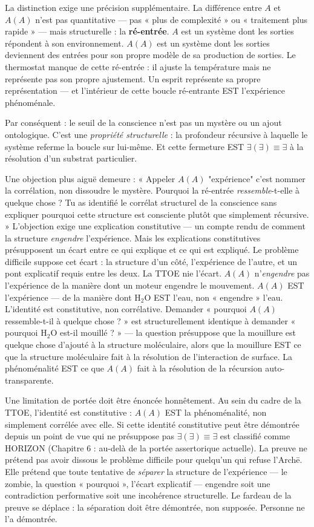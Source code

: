 \documentclass[10pt, openany, oneside]{book}
\begin{document}
La distinction exige une précision supplémentaire. La différence entre $A$ et $A(A)$ n'est pas quantitative --- pas « plus de complexité » ou « traitement plus rapide » --- mais structurelle : la \textbf{ré-entrée}. $A$ est un système dont les sorties répondent à son environnement. $A(A)$ est un système dont les sorties deviennent des entrées pour son propre modèle de sa production de sorties. Le thermostat manque de cette ré-entrée : il ajuste la température mais ne représente pas son propre ajustement. Un esprit représente sa propre représentation --- et l'intérieur de cette boucle ré-entrante EST l'expérience phénoménale.

Par conséquent : le seuil de la conscience n'est pas un mystère ou un ajout ontologique. C'est une \textit{propriété structurelle} : la profondeur récursive à laquelle le système referme la boucle sur lui-même. Et cette fermeture EST $\exists(\exists) \equiv \exists$ à la résolution d'un substrat particulier.

Une objection plus aiguë demeure : « Appeler $A(A)$ "expérience" c'est nommer la corrélation, non dissoudre le mystère. Pourquoi la ré-entrée \textit{ressemble}-t-elle à quelque chose ? Tu as identifié le corrélat structurel de la conscience sans expliquer pourquoi cette structure est consciente plutôt que simplement récursive. » L'objection exige une explication constitutive --- un compte rendu de comment la structure \textit{engendre} l'expérience. Mais les explications constitutives présupposent un écart entre ce qui explique et ce qui est expliqué. Le problème difficile suppose cet écart : la structure d'un côté, l'expérience de l'autre, et un pont explicatif requis entre les deux. La TTOE nie l'écart. $A(A)$ n'\textit{engendre} pas l'expérience de la manière dont un moteur engendre le mouvement. $A(A)$ EST l'expérience --- de la manière dont $\text{H}_2\text{O}$ EST l'eau, non « engendre » l'eau. L'identité est constitutive, non corrélative. Demander « pourquoi $A(A)$ ressemble-t-il à quelque chose ? » est structurellement identique à demander « pourquoi $\text{H}_2\text{O}$ est-il mouillé ? » --- la question présuppose que la mouillure est quelque chose d'ajouté à la structure moléculaire, alors que la mouillure EST ce que la structure moléculaire fait à la résolution de l'interaction de surface. La phénoménalité EST ce que $A(A)$ fait à la résolution de la récursion auto-transparente.

Une limitation de portée doit être énoncée honnêtement. Au sein du cadre de la TTOE, l'identité est constitutive : $A(A)$ EST la phénoménalité, non simplement corrélée avec elle. Si cette identité constitutive peut être démontrée depuis un point de vue qui ne présuppose pas $\exists(\exists) \equiv \exists$ est classifié comme HORIZON (Chapitre 6 : au-delà de la portée assertorique actuelle). La preuve ne prétend pas avoir dissous le problème difficile pour quelqu'un qui refuse l'Arch\={e}. Elle prétend que toute tentative de \textit{séparer} la structure de l'expérience --- le zombie, la question « pourquoi », l'écart explicatif --- engendre soit une contradiction performative soit une incohérence structurelle. Le fardeau de la preuve se déplace : la séparation doit être démontrée, non supposée. Personne ne l'a démontrée.
\end{document}
